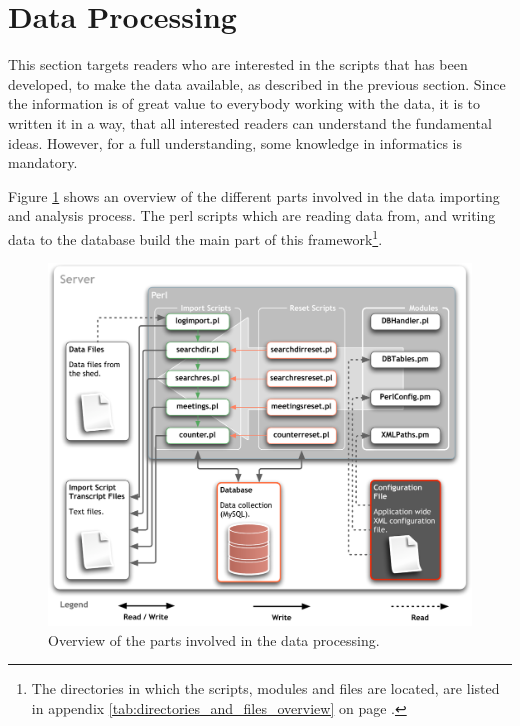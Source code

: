 \newpage
\section{Data Processing}
\label{sec:dataproc}

This section targets readers who are interested in the scripts that has been developed, to make the data available, as described in the previous section. Since the information is of great value to everybody working with the data, it is to written it in a way, that all interested readers can understand the fundamental ideas. However, for a full understanding, some knowledge in informatics is mandatory.      

Figure \ref{fig:app_design_perl} shows an overview of the different parts involved in the data importing and analysis process. The \ac{perl} scripts which are reading data from, and writing data to the database build the main part of this framework\footnote{The directories in which the scripts, modules and files are located, are listed in appendix \ref{tab:directories_and_files_overview} on page \pageref{tab:directories_and_files_overview}.}.

\begin{figure}[htpb]
\begin{center}
  \includegraphics[width=\textwidth]{assets/pdf/app_design_perl.pdf}
  \caption[Data processing overview]{Overview of the parts involved in the data processing.}
  \label{fig:app_design_perl}
\end{center}
\end{figure}

